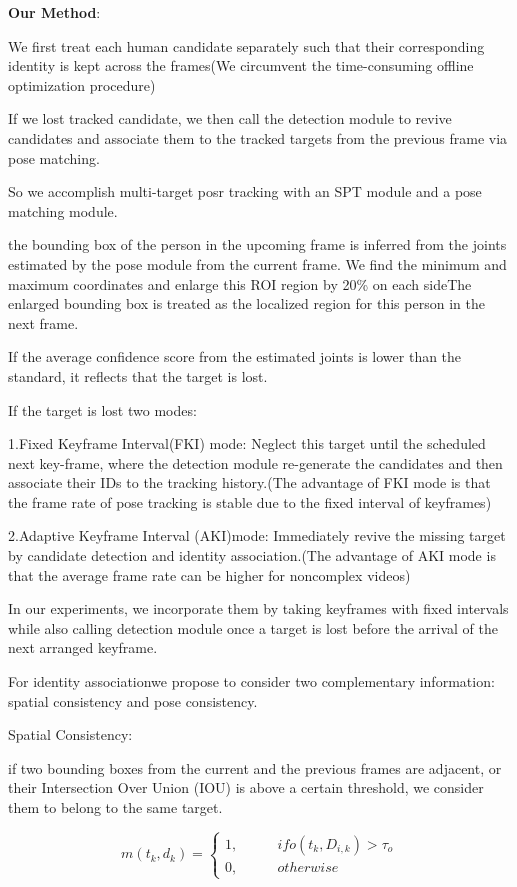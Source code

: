 \documentclass[11pt]{article}
\begin{document}
\textbf{Our Method}:

We first treat each human candidate separately such that their corresponding identity is kept across the frames(We circumvent the time-consuming offline optimization procedure)

If we lost tracked candidate, we then call the detection module to revive candidates and associate them to the tracked targets from the previous frame via pose matching.

So we accomplish multi-target posr tracking with an SPT module and a pose matching module.

the bounding box of the person in the upcoming frame is inferred from the joints estimated by the pose module from the current frame. We find the minimum and maximum coordinates and enlarge this ROI region by 20\% on each sideThe enlarged bounding box is treated as the localized region for this person in the next frame.

If the average confidence score from the estimated joints is lower than the standard, it reflects that the target is lost.

If the target is lost two modes:

\noindent 1.Fixed Keyframe Interval(FKI) mode: Neglect this target until
the scheduled next key-frame, where the detection module re-generate the candidates and then associate their IDs to the tracking history.(The advantage of FKI mode is that the frame rate of pose tracking is stable due to the fixed interval of keyframes)

\noindent 2.Adaptive Keyframe Interval (AKI)mode: Immediately revive the missing target by candidate detection and identity association.(The advantage of AKI mode is that the average frame rate can be higher for noncomplex videos)

In our experiments, we incorporate them by taking keyframes with fixed intervals while also calling detection module once a target is lost before the arrival of the next arranged keyframe.

For identity associationwe propose to consider two complementary information: spatial consistency and pose consistency.

\noindent Spatial Consistency:

if two bounding boxes from the current and the previous frames are adjacent, or their Intersection Over Union (IOU) is above a certain threshold, we consider them to belong to the same target.

$$m(t_k,d_k) = \left\{\begin{matrix}
	1,& \qquad if o(t_k,D_{i,k})> \tau_o\\ 
	0,& \qquad otherwise
\end{matrix}\right.$$
\end{document}

